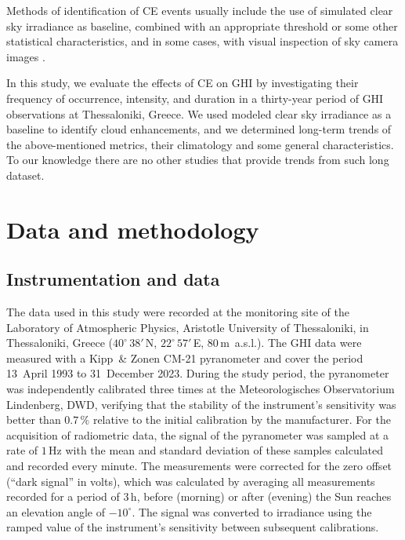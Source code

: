 \documentclass[preprint, 5p,
authoryear]{elsarticle} %
\begin{document}
Methods of identification of CE events usually include the use of
simulated clear sky irradiance as baseline, combined with an appropriate
threshold or some other statistical characteristics, and in some cases,
with visual inspection of sky camera images \citep[ and references
therein]{Vamvakas2020, Mol2023}.

In this study, we evaluate the effects of CE on GHI by investigating
their frequency of occurrence, intensity, and duration in a thirty-year
period of GHI observations at Thessaloniki, Greece. We used modeled
clear sky irradiance as a baseline to identify cloud enhancements, and
we determined long-term trends of the above-mentioned metrics, their
climatology and some general characteristics. To our knowledge there are
no other studies that provide trends from such long dataset.

\hypertarget{data-and-methodology}{%
\section{Data and methodology}\label{data-and-methodology}}

\hypertarget{instrumentation-and-data}{%
\subsection{Instrumentation and data}\label{instrumentation-and-data}}

The data used in this study were recorded at the monitoring site of the
Laboratory of Atmospheric Physics, Aristotle University of Thessaloniki,
in Thessaloniki, Greece (\(40^\circ\,38'\,\)N, \(22^\circ\,57'\,\)E,
\(80\,\)m~a.s.l.). The GHI data were measured with a Kipp~\& Zonen CM-21
pyranometer and cover the period 13~April 1993 to 31~December 2023.
During the study period, the pyranometer was independently calibrated
three times at the Meteorologisches Observatorium Lindenberg, DWD,
verifying that the stability of the instrument's sensitivity was better
than \(0.7\,\%\) relative to the initial calibration by the
manufacturer. For the acquisition of radiometric data, the signal of the
pyranometer was sampled at a rate of \(1\,\text{Hz}\) with the mean and
standard deviation of these samples calculated and recorded every
minute. The measurements were corrected for the zero offset (``dark
signal'' in volts), which was calculated by averaging all measurements
recorded for a period of \(3\,\text{h}\), before (morning) or after
(evening) the Sun reaches an elevation angle of \(-10^\circ\). The
signal was converted to irradiance using the ramped value of the
instrument's sensitivity between subsequent calibrations.
\end{document}
